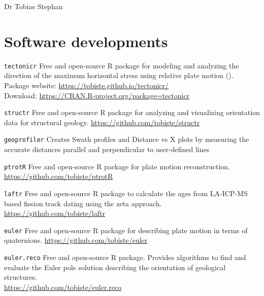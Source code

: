 \documentclass[10pt, paper=letter]{scrartcl} %
\begin{document}
\begin{cv}{\textsf{Dr Tobias Stephan}}
    \section{Software developments}
    \begin{cvlist}{}
        \item[\texttt{tectonicr}] Free and open-source R package for modeling and analyzing the direction of the maximum horizontal stress using relative plate motion ().\\
        Package website: \url{https://tobiste.github.io/tectonicr/}\\
        Download: \url{https://CRAN.R-project.org/package=tectonicr}
        \item[\texttt{structr}] Free and open-source R package for analyzing and visualizing orientation data for structural geology.
        \url{https://github.com/tobiste/structr}
        \item[\texttt{geoprofiler}] Creates Swath profiles and Distance vs X plots by measuring the accurate distances parallel and perpendicular to user-defined lines
        \item[\texttt{ptrotR}] Free and open-source R package for plate motion reconstruction.
        \url{https://github.com/tobiste/ptrotR}
        \item[\texttt{laftr}] Free and open-source R package to calculate the ages from LA-ICP-MS based fission track dating using the zeta approach.
        \url{https://github.com/tobiste/laftr}
        \item[\texttt{euler}] Free and open-source R package for describing plate motion in terms of quaternions.\newline
        \url{https://github.com/tobiste/euler}
        \item[\texttt{euler.reco}] Free and open-source R package. Provides algorithms to find and evaluate the Euler pole solution describing the orientation of geological structures.\\
        \url{https://github.com/tobiste/euler.reco}
    \end{cvlist}


\end{cv}
\end{document}
